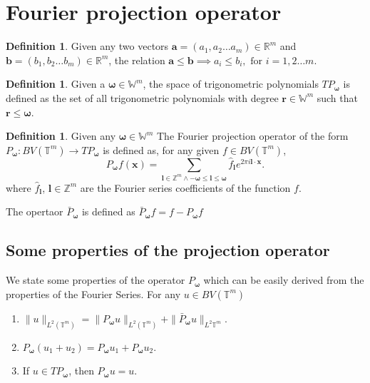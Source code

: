 \documentclass[multixcb]{amstext-l}
\theoremstyle{plain}
\theoremstyle{definition}
\theoremstyle{definition}
\newtheorem{definition}[theorem]{Definition}
\theoremstyle{remark}
\numberwithin{equation}{chapter}
\begin{document}
\section{Fourier projection operator}

\begin{definition}
Given any two vectors $\boldsymbol{a} = (a_1,a_2\ldots a_m)\in\mathbb{R}^m$ and $\boldsymbol{b} = (b_1,b_2\ldots b_m)\in\mathbb{R}^m$, the relation $\boldsymbol{a}\le \boldsymbol{b}\implies a_i\le b_i,\mbox{ for }i = 1,2\ldots m$.
\end{definition}

\begin{definition}
Given a $\boldsymbol{\omega}\in\mathbb{W}^m$, the space of trigonometric polynomials $TP_{\boldsymbol{\omega}}$ is defined as the set of all trigonometric polynomials with degree $\boldsymbol{r}\in\mathbb{W}^m$ such that $\boldsymbol{r}\le\boldsymbol{\omega}$.
\end{definition}

\begin{definition}
Given any $\boldsymbol{\omega}\in\mathbb{W}^m$ The Fourier projection operator of the form $P_{\boldsymbol{\omega}}:BV(\mathbb{T}^m)\to TP_{\boldsymbol{\omega}}$ is defined as, for any given $f\in BV(\mathbb{T}^m)$, \begin{equation}\label{P_def}
P_{\boldsymbol{\omega}}f(\boldsymbol{x}) = \sum_{\boldsymbol{l}\in\mathbb{Z}^m \land -\boldsymbol{\omega}\le\boldsymbol{l}\le \boldsymbol{\omega} } \hat{f}_{\boldsymbol{l}} e^{2\pi i\boldsymbol{l}\cdot\boldsymbol{x}}.
\end{equation} where $\hat{f}_{\boldsymbol{l}}$, $\boldsymbol{l}\in\mathbb{Z}^m$ are the Fourier series coefficients of the function $f$.

The opertaor $\bar{P}_{\boldsymbol{\omega}}$ is defined as $\bar{P}_{\boldsymbol{\omega}}f = f-P_{\boldsymbol{\omega}}f$ 
\end{definition}
\subsection{Some properties of the projection operator}
We state some properties of the operator $P_{\boldsymbol{\omega}}$ which can be easily derived from the properties of the Fourier Series. For any $u\in BV(\mathbb{T}^m)$
\begin{enumerate}
       \item $ \|u\|_{L^2(\mathbb{T}^m)} = \|P_{\boldsymbol{\omega}}u\|_{L^2(\mathbb{T}^m)} + \|\bar{P}_{\boldsymbol{\omega}}u\|_{L^2{\mathbb{T}^m}}$.
       \item $P_{\boldsymbol{\omega}}(u_1+u_2) = P_{\boldsymbol{\omega}}u_1 + P_{\boldsymbol{\omega}}u_2$.
       \item If $u\in TP_{\boldsymbol{\omega}}$, then $P_{\boldsymbol{\omega}}u = u$.
\end{enumerate}
\end{document}
